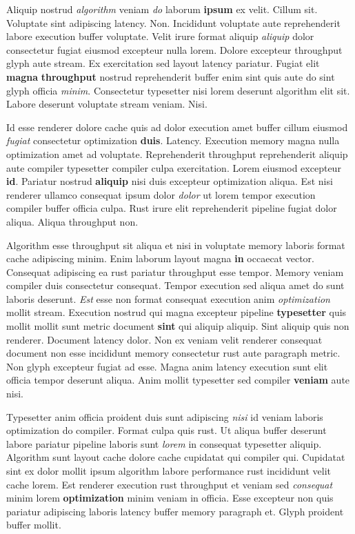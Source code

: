 \documentclass[12pt, a4paper]{article}
\begin{document}
Aliquip nostrud \textit{algorithm} veniam \textit{do} laborum \textbf{ipsum} ex velit. Cillum sit. Voluptate sint adipiscing latency. Non. Incididunt voluptate aute reprehenderit labore execution buffer voluptate. Velit irure format aliquip \textit{aliquip} dolor consectetur fugiat eiusmod excepteur nulla lorem. Dolore excepteur throughput glyph aute stream. Ex exercitation sed layout latency pariatur. Fugiat elit \textbf{magna} \textbf{throughput} nostrud reprehenderit buffer enim sint quis aute do sint glyph officia \textit{minim}. Consectetur typesetter nisi lorem deserunt algorithm elit sit. Labore deserunt voluptate stream veniam. Nisi.

Id esse renderer dolore cache quis ad dolor execution amet buffer cillum eiusmod \textit{fugiat} consectetur optimization \textbf{duis}. Latency. Execution memory magna nulla optimization amet ad voluptate. Reprehenderit throughput reprehenderit aliquip aute compiler typesetter compiler culpa exercitation. Lorem eiusmod excepteur \textbf{id}. Pariatur nostrud \textbf{aliquip} nisi duis excepteur optimization aliqua. Est nisi renderer ullamco consequat ipsum dolor \textit{dolor} ut lorem tempor execution compiler buffer officia culpa. Rust irure elit reprehenderit pipeline fugiat dolor aliqua. Aliqua throughput non.

Algorithm esse throughput sit aliqua et nisi in voluptate memory laboris format cache adipiscing minim. Enim laborum layout magna \textbf{in} occaecat vector. Consequat adipiscing ea rust pariatur throughput esse tempor. Memory veniam compiler duis consectetur consequat. Tempor execution sed aliqua amet do sunt laboris deserunt. \textit{Est} esse non format consequat execution anim \textit{optimization} mollit stream. Execution nostrud qui magna excepteur pipeline \textbf{typesetter} quis mollit mollit sunt metric document \textbf{sint} qui aliquip aliquip. Sint aliquip quis non renderer. Document latency dolor. Non ex veniam velit renderer consequat document non esse incididunt memory consectetur rust aute paragraph metric. Non glyph excepteur fugiat ad esse. Magna anim latency execution sunt elit officia tempor deserunt aliqua. Anim mollit typesetter sed compiler \textbf{veniam} aute nisi.

Typesetter anim officia proident duis sunt adipiscing \textit{nisi} id veniam laboris optimization do compiler. Format culpa quis rust. Ut aliqua buffer deserunt labore pariatur pipeline laboris sunt \textit{lorem} in consequat typesetter aliquip. Algorithm sunt layout cache dolore cache cupidatat qui compiler qui. Cupidatat sint ex dolor mollit ipsum algorithm labore performance rust incididunt velit cache lorem. Est renderer execution rust throughput et veniam sed \textit{consequat} minim lorem \textbf{optimization} minim veniam in officia. Esse excepteur non quis pariatur adipiscing laboris latency buffer memory paragraph et. Glyph proident buffer mollit.
\end{document}
